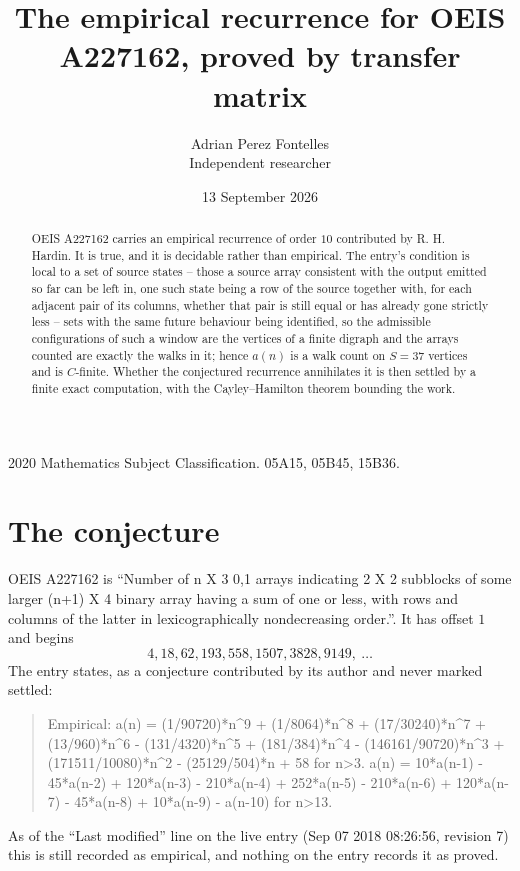 \documentclass[11pt,a4paper]{article}
\title{The empirical recurrence for OEIS A227162, proved by transfer matrix}
\author{Adrian Perez Fontelles\\ \small Independent researcher}
\date{13 September 2026}
\theoremstyle{plain}
\theoremstyle{definition}
\begin{document}
\maketitle

\begin{abstract}
OEIS A227162 carries an empirical recurrence of order $10$ contributed by R. H. Hardin. It is
true, and it is decidable rather than empirical. The entry's condition is local to a set of source states -- those a source array consistent with the output emitted so far can be left in, one such state being a row of the source together with, for each adjacent pair of its columns, whether that pair is still equal or has already gone strictly less -- sets with the same future behaviour being identified, so
the admissible configurations of such a window are the vertices of a finite digraph and the
arrays counted are exactly the walks in it; hence $a(n)$ is a walk count on $S=37$ vertices
and is $C$-finite. Whether the conjectured recurrence annihilates it is then settled by a
finite exact computation, with the Cayley--Hamilton theorem bounding the work.
\end{abstract}

\noindent\small 2020 Mathematics Subject Classification. 05A15, 05B45, 15B36.\normalsize

\section{The conjecture}

OEIS A227162 is ``Number of n X 3 0,1 arrays indicating 2 X 2 subblocks of some larger (n+1) X 4 binary array having a sum of one or less, with rows and columns of the latter in lexicographically nondecreasing order.''. It has offset $1$ and begins
\[
4, 18, 62, 193, 558, 1507, 3828, 9149,\ \dots
\]
The entry states, as a conjecture contributed by its author and never marked settled:
\begin{quote}
Empirical: a(n) = (1/90720)*n\^{}9 + (1/8064)*n\^{}8 + (17/30240)*n\^{}7 + (13/960)*n\^{}6 - (131/4320)*n\^{}5 + (181/384)*n\^{}4 - (146161/90720)*n\^{}3 + (171511/10080)*n\^{}2 - (25129/504)*n + 58 for n>3. a(n) = 10*a(n-1) - 45*a(n-2) + 120*a(n-3) - 210*a(n-4) + 252*a(n-5) - 210*a(n-6) + 120*a(n-7) - 45*a(n-8) + 10*a(n-9) - a(n-10) for n>13.
\end{quote}
As of the ``Last modified'' line on the live entry (Sep 07 2018 08:26:56, revision 7) this is still
recorded as empirical, and nothing on the entry records it as proved.
\end{document}
